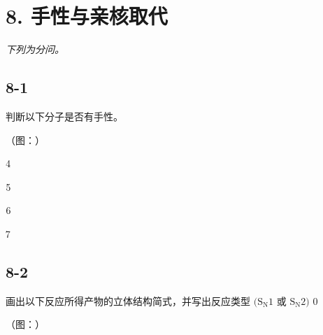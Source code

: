 \section*{8. 手性与亲核取代}
\textit{下列为分问。}

\subsection*{8-1}
判断以下分⼦是否有⼿性。

（图：）









\subsection*{8-2}
画出以下反应所得产物的⽴体结构简式，并写出反应类型 $( \mathrm { S } _ { \mathrm { N } } 1$ 或 $\mathrm { S } _ { \mathrm { N } } 2 )$ 0

（图：）
